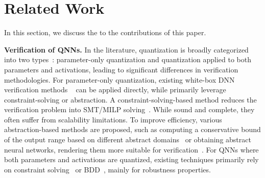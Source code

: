 \section{Related Work}
\label{sec:relatedwork}
In this section, we discuss the  to the contributions of this paper.
\vspace{2mm}

\noindent
{\bf Verification of QNNs.}
In the literature, quantization is broadly categorized into two types~\cite{gholami2021survey}: parameter-only quantization and quantization applied to both parameters and activations, leading to significant differences in verification methodologies. 
For parameter-only quantization, existing white-box DNN verification methods ~\cite{KBDJK17,LiLHY0ZXH20,betaCrown,GuoWZZSW21,backVerify22} can be applied directly, while
primarily leverage constraint-solving or abstraction. A constraint-solving-based method reduces the verification problem into 
SMT/MILP solving~\cite{KBDJK17,KatzHIJLLSTWZDK19,ChengNR17,PrabhakarA19,fischetti2018deep}. While sound and complete, they often suffer from scalability limitations. To improve efficiency, various abstraction-based methods are proposed, such as computing a conservative bound of the output range based on different abstract domains~\cite{GMDTCV18,LiLHY0ZXH20,SGMPV18,SGPV19} or obtaining abstract neural networks, rendering them more suitable for verification~\cite{AshokHKM20,ZZCSCL22,ElboherGK20,OBKatz22,LXSSXM22}. 
For QNNs where both parameters and activations are quantized, existing techniques primarily rely on constraint solving~\cite{GiacobbeHL20,scaleQNN21,huang2023towards,zhang2023qebverif} or BDD~\cite{BDD4BNN,zhang2023precise}, mainly for robustness properties. 
\vspace{2mm}

